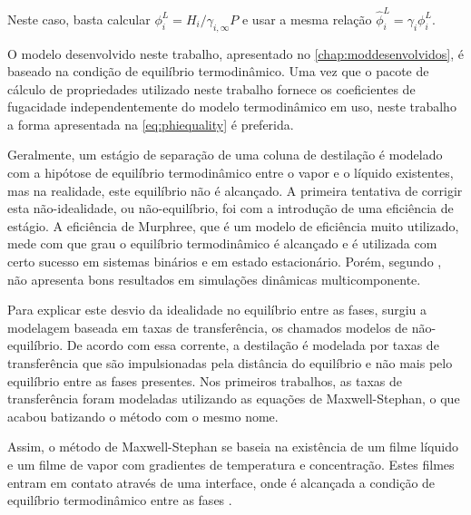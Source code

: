 \begin{enumerate}
Neste caso, basta calcular $\phi^L_i = H_i / \gamma_{i,\infty} P$ e usar a mesma relação
$\hat{\phi}^L_i = \gamma_i \phi^L_i$.

O modelo desenvolvido neste trabalho, apresentado no \autoref{chap:moddesenvolvidos}, é baseado na condição de equilíbrio
termodinâmico.
Uma vez que o pacote de cálculo de propriedades utilizado neste trabalho
fornece os coeficientes de fugacidade independentemente do modelo termodinâmico
em uso, neste trabalho a forma apresentada na \autoref{eq:phiequality} é
preferida.

Geralmente, um estágio de separação de uma coluna de destilação é modelado com a hipótose de equilíbrio  termodinâmico
entre o vapor e o líquido existentes, mas na realidade, este equilíbrio não é alcançado. A primeira tentativa de corrigir
esta não-idealidade, ou não-equilíbrio, foi com a introdução de uma eficiência de estágio.
A eficiência de Murphree, que é um modelo de
eficiência muito utilizado, mede com que grau o equilíbrio termodinâmico é alcançado e é utilizada com certo sucesso em
sistemas binários e em estado estacionário. Porém, segundo , não apresenta bons resultados
em simulações dinâmicas multicomponente.

Para explicar este desvio da idealidade no equilíbrio entre as fases, surgiu a
modelagem baseada em taxas de transferência, os chamados modelos de não-equilíbrio. De acordo com
essa corrente, a destilação é modelada por taxas de transferência que são
impulsionadas pela distância do equilíbrio e não mais pelo equilíbrio entre as
fases presentes. Nos primeiros trabalhos, as taxas de transferência foram modeladas
utilizando as equações de Maxwell-Stephan, o que acabou batizando o método
com o mesmo nome.

Assim, o método de Maxwell-Stephan se baseia na existência de um filme líquido e um filme de vapor com gradientes de
temperatura e concentração. Estes filmes entram em contato através de uma interface, onde é alcançada a condição de
equilíbrio termodinâmico entre as fases \cite{Koeijer:2004}.


\end{enumerate}
